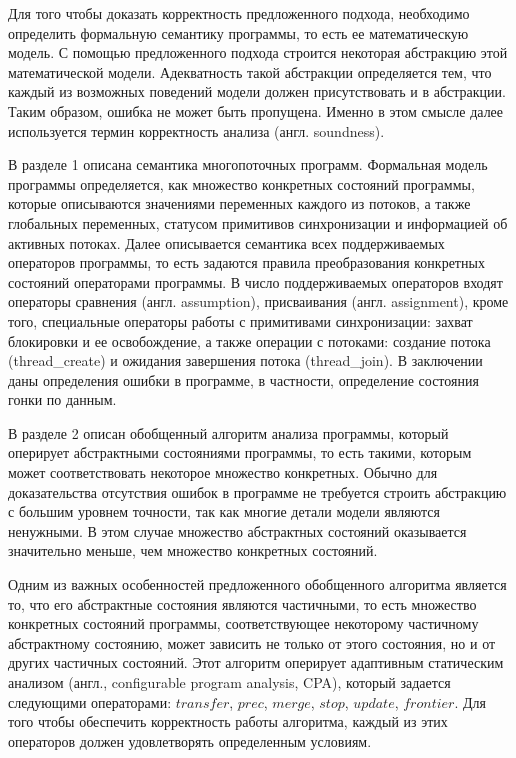 Для того чтобы доказать корректность предложенного подхода, необходимо определить формальную семантику программы, то есть ее математическую модель.
С помощью предложенного подхода строится некоторая абстракцию этой математической модели. 
Адекватность такой абстракции определяется тем, что каждый из возможных поведений модели должен присутствовать и в абстракции.
Таким образом, ошибка не может быть пропущена.
Именно в этом смысле далее используется термин корректность анализа (англ. soundness).

В разделе 1 описана семантика многопоточных программ. 
Формальная модель программы определяется, как множество конкретных состояний программы, которые описываются значениями переменных каждого из потоков, а также глобальных переменных, статусом примитивов синхронизации и информацией об активных потоках.
Далее описывается семантика всех поддерживаемых операторов программы, то есть задаются правила преобразования конкретных состояний операторами программы.
В число поддерживаемых операторов входят операторы сравнения (англ. assumption), присваивания (англ. assignment),
кроме того, специальные операторы работы с примитивами синхронизации: захват блокировки и ее освобождение, а также операции с потоками: создание потока (thread\_create) и ожидания завершения потока (thread\_join).
В заключении даны определения ошибки в программе, в частности, определение состояния гонки по данным.

В разделе 2 описан обобщенный алгоритм анализа программы, который оперирует абстрактными состояниями программы, то есть такими, которым может соответствовать некоторое множество конкретных.
Обычно для доказательства отсутствия ошибок в программе не требуется строить абстракцию с большим уровнем точности, так как многие детали модели являются ненужными. 
В этом случае множество абстрактных состояний оказывается значительно меньше, чем множество конкретных состояний.
 
Одним из важных особенностей предложенного обобщенного алгоритма является то, что его абстрактные состояния являются частичными, то есть множество конкретных состояний программы, соответствующее некоторому частичному абстрактному состоянию, может зависить не только от этого состояния, но и от других частичных состояний. 
Этот алгоритм оперирует адаптивным статическим анализом (англ., configurable program analysis, CPA), который задается следующими операторами: $transfer$, $prec$, $merge$, $stop$, $update$, $frontier$.
Для того чтобы обеспечить корректность работы алгоритма, каждый из этих операторов должен удовлетворять определенным условиям.

